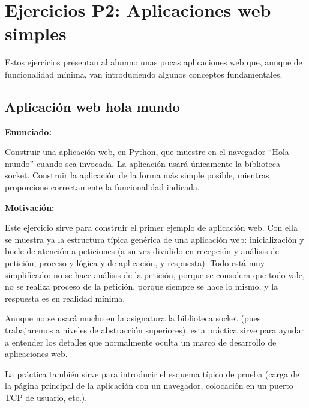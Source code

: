 \section{Ejercicios P2: Aplicaciones web simples}

Estos ejercicios presentan al alumno unas pocas aplicaciones web que, aunque de funcionalidad mínima, van introduciendo algunos conceptos fundamentales.

\subsection{Aplicación web hola mundo}
\label{subsec:aplweb-hola-mundo}

\textbf{Enunciado:}

Construir una aplicación web, en Python, que muestre en el navegador ``Hola mundo'' cuando sea invocada. La aplicación usará únicamente la biblioteca socket. Construir la aplicación de la forma más simple posible, mientras proporcione correctamente la funcionalidad indicada.

\textbf{Motivación:}

Este ejercicio sirve para construir el primer ejemplo de aplicación web. Con ella se muestra ya la estructura típica genérica de una aplicación web: inicialización y bucle de atención a peticiones (a su vez dividido en recepción y análisis de petición, proceso y lógica y de aplicación, y respuesta). Todo está muy simplificado: no se hace análisis de la petición, porque se considera que todo vale, no se realiza proceso de la petición, porque siempre se hace lo mismo, y la respuesta es en realidad mínima.

Aunque no se usará mucho en la asignatura la biblioteca socket (pues trabajaremos a niveles de abstracción superiores), esta práctica sirve para ayudar a entender los detalles que normalmente oculta un marco de desarrollo de aplicaciones web.

La práctica también sirve para introducir el esquema típico de prueba (carga de la página principal de la aplicación con un navegador, colocación en un puerto TCP de usuario, etc.).

